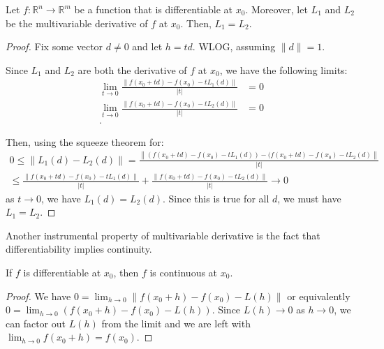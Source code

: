 \begin{theorem}
\label{thr:Uniqueness of multivariable derivative}
  Let \( f: \mathbb{R}^{n} \to  \mathbb{R}^{m} \) be a function that is
  differentiable at \( x_{0} \). Moreover, let \( L_{1} \) and \( L_{2} \) be
  the multivariable derivative of \( f \) at \( x_{0} \). Then, \( L_{1} = L_{2}
  \).
\end{theorem}
\begin{proof}
  Fix some vector \( d \neq 0 \) and let \( h = t d \). WLOG, assuming \( \|d\|
  = 1\).

  Since \( L_{1} \) and \( L_{2} \) are both the derivative of \( f \) at \(
  x_{0} \), we have the following limits:
  \begin{align*}
    \lim_{t \to  0} \frac{\|f(x_{0} + t d) - f(x_{0}) - tL_{1}(d) \|}{|t|} &= 0\\
    \lim_{t \to  0} \frac{\|f(x_{0} + t d) - f(x_{0}) - tL_{2}(d) \|}{|t|} &= 0\\
  .\end{align*}

  Then, using the squeeze theorem for:
  \begin{gather*}
    0 \le \|L_{1}(d) - L_{2}(d)\| = \frac{\left\| (f(x_{0}+t d) -
    f(x_{0})-tL_{1}(d)) - (f(x_{0} + t d) - f(x_{0}) - tL_{2}(d) \right\|
  }{|t|}\\
  \le 
    \frac{\|f(x_{0} + t d) - f(x_{0}) - tL_{1}(d) \|}{|t|} +
    \frac{\|f(x_{0} + t d) - f(x_{0}) - tL_{2}(d) \|}{|t|} \to  0
  \end{gather*} as \( t \to 0 \), we have \( L_{1}(d) = L_{2}(d) \). Since this
  is true for all \( d \), we must have \( L_{1} = L_{2} \).
\end{proof}

Another instrumental property of multivariable derivative is the fact that
differentiability implies continuity.

\begin{theorem}
\label{thr:Differentiability implies continuity}
  If \( f \) is differentiable at \( x_{0} \), then \( f \) is continuous at \(
  x_{0}\).
\end{theorem}

\begin{proof}
  We have \( 0 = \lim_{h \to 0} \|f(x_{0} + h) - f(x_{0}) - L(h)\| \) or
  equivalently \( 0 = \lim_{h \to 0} (f(x_{0} + h) - f(x_{0}) - L(h)) \). Since
  \( L(h) \to 0 \) as \( h \to 0 \), we can factor out \( L(h) \) from the limit
  and we are left with \( \lim_{h\to 0} f(x_{0} + h) = f(x_{0}) \).
\end{proof}


